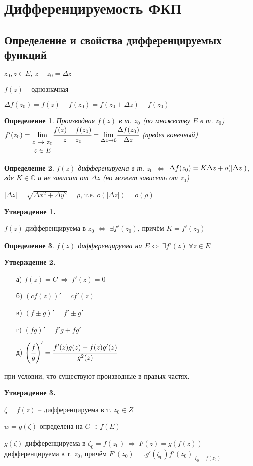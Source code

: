 \documentclass[final]{report}
\newcommand{\then}{\ \Rightarrow\ }
\renewcommand{\C}{\mathbb{C}}
\newcommand{\mlim}[1]{\underset{#1}{\lim}}
\newcommand{\LRA}{\Leftrightarrow}
\newcommand{\D}{\Delta}
\renewcommand{\o}{\Bar{o}}
\newcommand{\mat}[1]{\begin{matrix}#1\end{matrix}}
\newcommand{\opr}[1]{\begin{opred}#1\end{opred}}
\newtheorem*{opred}{Определение}
\theoremstyle{remark}
\begin{document}
\newpage

\section{Дифференцируемость ФКП}

\subsection{Определение и свойства дифференцируемых функций}

$z_0,z\in E,\ z-z_0=\Delta z$

$f(z)$ -- однозначная

$\Delta f(z_0)=f(z)-f(z_0)=f(z_0+\Delta z)-f(z_0)$

\opr{Производная $f(z)$ в т. $z_0$ (по множеству $E$ в т. $z_0$) $f'(z_0)=\mlim{\mat{z\to z_0 \\ z\in E}}\cfrac{f(z)-f(z_0)}{z-z_0}=\mlim{\D z\to 0}\cfrac{\D f(z_0)}{\D z}$ (предел конечный)}

\opr{$f(z)$ дифференируема в т. $z_0$ $\LRA$ $\D f(z_0)=K\D z+\o(|\D z|)$, где $K\in\C$ и не зависит от $\D z$ (но может зависеть от $z_0$)}

$|\D z|=\sqrt{\D x^2+\D y^2}=\rho$, т.е. $\overline{o}(|\D z|)=\overline{o}(\rho)$

{\bfseries Утверждение 1.}

$f(z)$ дифференцируема в $z_0$ $\LRA$ $\exists f'(z_0)$, причём $K=f'(z_0)$

\opr{$f(z)$ дифференцируема на $E\LRA\ \exists f'(z)\ \forall z\in E$ }

{\bfseries Утверждение 2.}
\begin{itemize}
\item[а)] $f(z)=C\then f'(z)=0$
\item[б)] $(cf(z))'=cf'(z)$
\item[в)] $(f\pm g)'=f'\pm g'$
\item[г)] $(fg)'=f'g+fg'$
\item[д)] $\left(\cfrac fg\right)'=\cfrac{f'(z)g(z)-f(z)g'(z)}{g^2(z)}$
\end{itemize} при условии, что существуют производные в правых частях.

{\bfseries Утверждение 3.}

$\zeta=f(z)$ -- дифференцируема в т. $z_0\in Z$

$w=g(\zeta)$ определена на $G\supset f(E)$

$g(\zeta)$ дифференцируема в $\zeta_0=f(z_0)\then F(z)=g(f(z))$ дифференцируема в т. $z_0$, причём $F'(z_0)=\bigl.g'(\zeta_0)f'(z_0)\bigr|_{\zeta_0=f(z_0)}$
\end{document}
